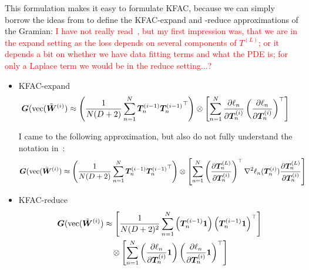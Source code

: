 This formulation makes it easy to formulate KFAC, because we can simply borrow the ideas from \cite{eschenhagen2023kroneckerfactored} to define the KFAC-expand and -reduce approximations of the Gramian:
\textcolor{red}{I have not really read~\cite{eschenhagen2023kroneckerfactored}, but my first impression was, that we are in the expand setting as the loss depends on several components of $T^{(L)}$; or it depends a bit on whether we have data fitting terms and what the PDE is; for only a Laplace term we would be in the reduce setting...?}
\begin{itemize}
\item KFAC-expand
  \begin{align}
    {\bm{G}}(\operatorname{vec}(\tilde{{\bm{W}}}^{(i)})
    &\approx
      \left(
      \frac{1}{N (D+2)}
      \sum_{n=1}^N
      {\bm{T}}_n^{(i-1)}
      {{\bm{T}}_n^{(i-1)}}^{\top}
      \right)
      \otimes
      \left[
      \sum_{n=1}^N
      \frac{\partial \ell_n}{\partial {\bm{T}}_n^{(i)}}
      \left(
      \frac{\partial \ell_n}{\partial {\bm{T}}_n^{(i)}}
      \right)^{\top}
      \right]
  \end{align}

    I came to the following approximation, but also do not fully understand the notation in~\cite{eschenhagen2023kroneckerfactored}: 
  \begin{align}
    {\bm{G}}(\operatorname{vec}(\tilde{{\bm{W}}}^{(i)})
    &\approx
      \left(
      \frac{1}{N (D+2)}
      \sum_{n=1}^N
      {\bm{T}}_n^{(i-1)}
      {{\bm{T}}_n^{(i-1)}}^{\top}
      \right)
      \otimes
      \left[
      \sum_{n=1}^N
      \left(
      \frac{\partial {\bm{T}}_n^{(L)}}{\partial {\bm{T}}_n^{(i)}}
      \right)^{\top}
      \nabla^2 \ell_n({\bm{T}}_n^{(i)}) 
      \frac{\partial {\bm{T}}_n^{(L)}}{\partial {\bm{T}}_n^{(i)}}
      \right]
  \end{align}

\item KFAC-reduce
  \begin{align}
    \begin{split}
      {\bm{G}}(\operatorname{vec}(\tilde{{\bm{W}}}^{(i)})
      &\approx
        \left[
        \frac{1}{N (D+2)^2}
        \sum_{n=1}^N
        \left(
        {\bm{T}}_n^{(i-1)} {\bm{1}}
        \right)
        \left(
        {\bm{T}}_n^{(i-1)} {\bm{1}}
        \right)^{\top}
        \right]
      \\
      &\phantom{\approx\,}\otimes
        \left[
        \sum_{n=1}^N
        \left(
        \frac{\partial \ell_n}{\partial {\bm{T}}_n^{(i)}}
        {\bm{1}}
        \right)
        \left(
        \frac{\partial \ell_n}{\partial {\bm{T}}_n^{(i)}}
        {\bm{1}}
        \right)^{\top}
        \right]
    \end{split}
  \end{align}
\end{itemize}


